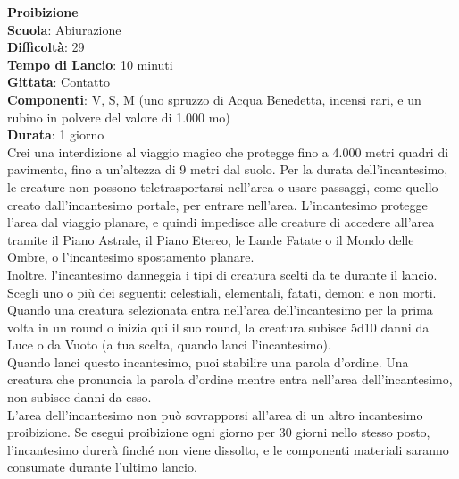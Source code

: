 \begin{multicols}{2}
\medskip\textbf{Proibizione}\\
\textbf{Scuola}: Abiurazione\\
\textbf{Difficoltà}: 29\\
\textbf{Tempo di Lancio}: 10 minuti\\
\textbf{Gittata}: Contatto\\
\textbf{Componenti}: V, S, M (uno spruzzo di Acqua Benedetta, incensi rari, e un rubino in polvere del valore di 1.000 mo)\\
\textbf{Durata}: 1 giorno\\
Crei una interdizione al viaggio magico che protegge fino a 4.000 metri quadri di pavimento, fino a un'altezza di 9 metri dal suolo. Per la durata dell'incantesimo, le creature non possono teletrasportarsi nell'area o usare passaggi, come quello creato dall'incantesimo portale, per entrare nell'area. L'incantesimo protegge l'area dal viaggio planare, e quindi impedisce alle creature di accedere all'area tramite il Piano Astrale, il Piano Etereo, le Lande Fatate o il Mondo delle Ombre, o l'incantesimo spostamento planare.\\
Inoltre, l'incantesimo danneggia i tipi di creatura scelti da te durante il lancio. Scegli uno o più dei seguenti: celestiali, elementali, fatati, demoni e non morti. Quando una creatura selezionata entra nell'area dell'incantesimo per la prima volta in un round o inizia qui il suo round, la creatura subisce 5d10 danni da Luce o da Vuoto (a tua scelta, quando lanci l'incantesimo). \\
Quando lanci questo incantesimo, puoi stabilire una parola d'ordine. Una creatura che pronuncia la parola d'ordine mentre entra nell'area dell'incantesimo, non subisce danni da esso.\\
L'area dell'incantesimo non può sovrapporsi all'area di un altro incantesimo proibizione. Se esegui proibizione ogni giorno per 30 giorni nello stesso posto, l'incantesimo durerà finché non viene dissolto, e le componenti materiali saranno consumate durante l'ultimo lancio.


\end{multicols}
